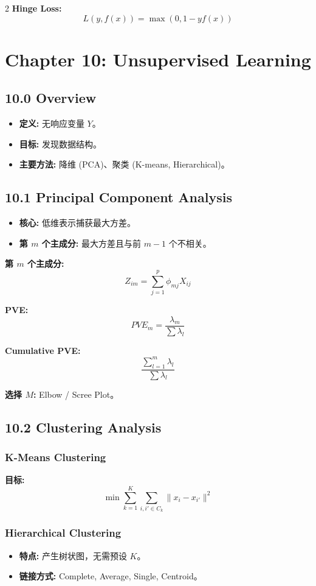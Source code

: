 \documentclass[6pt,a4paper]{ctexart}
\begin{document}
\begin{multicols}{2}
\textbf{Hinge Loss:}
$$ L(y, f(x)) = \max(0, 1 - y f(x)) $$

\section*{Chapter 10: Unsupervised Learning}

\subsection*{10.0 Overview}
\begin{itemize}
    \item \textbf{定义:} 无响应变量 $Y$。
    \item \textbf{目标:} 发现数据结构。
    \item \textbf{主要方法:} 降维 (PCA)、聚类 (K-means, Hierarchical)。
\end{itemize}

\subsection*{10.1 Principal Component Analysis}
\begin{itemize}
    \item \textbf{核心:} 低维表示捕获最大方差。
    \item \textbf{第 $m$ 个主成分:} 最大方差且与前 $m-1$ 个不相关。
\end{itemize}

\textbf{第 $m$ 个主成分:}
$$ Z_{im} = \sum_{j=1}^{p} \phi_{mj} X_{ij} $$

\textbf{PVE:}
$$ PVE_{m} = \frac{\lambda_{m}}{\sum \lambda_{l}} $$

\textbf{Cumulative PVE:}
$$ \frac{\sum_{l=1}^{m} \lambda_{l}}{\sum \lambda_{l}} $$

\textbf{选择 $M$:} Elbow / Scree Plot。

\subsection*{10.2 Clustering Analysis}

\subsubsection*{K-Means Clustering}
\textbf{目标:}
$$ \min \sum_{k=1}^{K} \sum_{i,i' \in C_k} \|x_i - x_{i'}\|^2 $$

\subsubsection*{Hierarchical Clustering}
\begin{itemize}
    \item \textbf{特点:} 产生树状图，无需预设 $K$。
    \item \textbf{链接方式:} Complete, Average, Single, Centroid。
\end{itemize}


\end{multicols}
\end{document}
